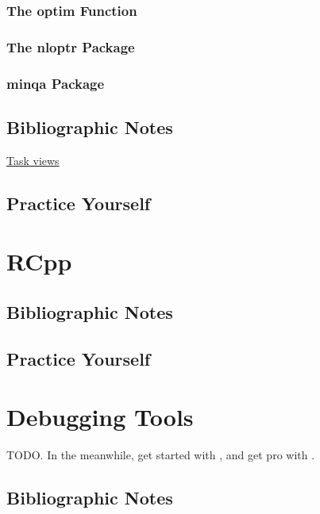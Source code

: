 \documentclass[]{book}
\theoremstyle{definition}
\theoremstyle{definition}
\theoremstyle{definition}
\theoremstyle{remark}
\begin{document}
\subsection{The optim Function}\label{the-optim-function}

\subsection{The nloptr Package}\label{the-nloptr-package}

\subsection{minqa Package}\label{minqa-package}

\section{Bibliographic Notes}\label{bibliographic-notes-15}

\href{https://cran.r-project.org/web/views/Optimization.html}{Task
views}

\section{Practice Yourself}\label{practice-yourself-14}

\chapter{RCpp}\label{rcpp}

\section{Bibliographic Notes}\label{bibliographic-notes-16}

\section{Practice Yourself}\label{practice-yourself-15}

\chapter{Debugging Tools}\label{debugging}

TODO. In the meanwhile, get started with \citet{wickham2011testthat},
and get pro with \citet{cotton2017testing}.

\section{Bibliographic Notes}\label{bibliographic-notes-17}
\end{document}
